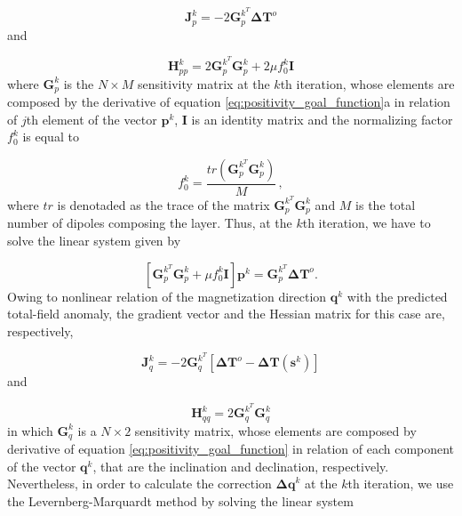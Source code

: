 \begin{equation}
\mathbf{J}_{p}^{k} = -2 \mathbf{G}_{p}^{k^T} \mathbf{\Delta T}^o
\label{eq:grad_p}
\end{equation}   
and   

\begin{equation}
\mathbf{H}_{pp}^{k} = 2 \mathbf{G}_{p}^{k^T} \mathbf{G}_{p}^{k} + 2 \mu f_{0}^{k} \mathbf{I} 
\label{eq:hess_p}
\end{equation}
where $\mathbf{G}_p^{k}$ is the $N \times M$ sensitivity matrix at the $k$th iteration, whose elements are composed by the derivative of equation \ref{eq:positivity_goal_function}a in relation of $j$th element of the vector $\mathbf{p}^k$, $\mathbf{I}$ is an identity matrix and the normalizing factor $f_{0}^{k}$ is equal to

\begin{equation}
f_{0}^{k} = \dfrac{tr(\mathbf{G}_{p}^{k^T} \mathbf{G}_{p}^{k})}{M} \, ,
\label{eq:norm_factor}
\end{equation}
where $tr$ is denotaded as the trace of the matrix $\mathbf{G}_{p}^{k^T} \mathbf{G}_{p}^{k}$ and $M$ is the total number of dipoles composing the layer. Thus, at the $k$th iteration, we have to solve the linear system given by

\begin{equation}
\left[ \mathbf{G}_{p}^{k^T} \mathbf{G}_{p}^{k} + \mu f_{0}^{k} \mathbf{I} \right] \mathbf{p}^{k} = \mathbf{G}_{p}^{k^T} \mathbf{\Delta T}^o.
\label{eq:linear_sys_p}
\end{equation} 
Owing to nonlinear relation of the magnetization direction $\mathbf{q}^k$ with the predicted total-field anomaly, the gradient vector and the Hessian matrix for this case are, respectively,

\begin{equation}
\mathbf{J}_{q}^{k} = -2 \mathbf{G}_{q}^{k^T} [ \mathbf{\Delta T}^o -  \mathbf{\Delta T} (\mathbf{s}^k) ] 
\label{eq:grad_q}
\end{equation}   
and   

\begin{equation}
\mathbf{H}_{qq}^{k} = 2 \mathbf{G}_{q}^{k^T} \mathbf{G}_{q}^{k} 
\label{eq:hess_q}
\end{equation}
in which $\mathbf{G}_q^k$ is a $N \times 2$ sensitivity matrix, whose elements are composed by derivative of equation \ref{eq:positivity_goal_function} in relation of each component of the vector $\mathbf{q}^k$, that are the inclination and declination, respectively. Nevertheless, in order to calculate the correction $\mathbf{\Delta q}^k$ at the $k$th iteration, we use the Levernberg-Marquardt method \citep{aster2005} by solving the linear system

